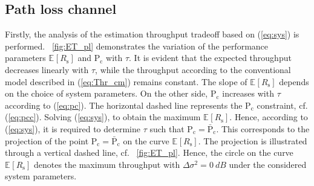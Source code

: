 \documentclass[conference, twocolumn]{IEEEtran}
\newcommand{\e}[2]{{\mathbb E}_{#1}\left[ #2 \right]}
\newcommand{\sub}[1]{_{\text{#1}}}
\newcommand{\pc}{\text{P}\sub{c}}
\newcommand{\pcd}{\bar{\text{P}}\sub{c}}
\newcommand{\rs}{R\sub{s}}
\newcommand{\ers}{\e{}{\rs}}
\newcommand{\npu}{\Delta\sigma^2}
\begin{document}
\subsection{Path loss channel}
Firstly, the analysis of the estimation throughput tradeoff based on (\ref{eq:sys}) is performed. \figurename~\ref{fig:ET_pl} demonstrates the variation of the performance parameters $\ers$ and $\pc$ with $\tau$. It is evident that the expected throughput decreases linearly with $\tau$, while the throughput according to the conventional model described in (\ref{eq:Thr_cm}) remains constant. The slope of $\ers$ depends on the choice of system parameters. On the other side, $\pc$ increases with $\tau$ according to (\ref{eq:pc}). The horizontal dashed line represents the $\pc$ constraint, cf. (\ref{eq:pcc}). Solving (\ref{eq:sys}), to obtain the maximum $\ers$. Hence, according to (\ref{eq:sys}), it is required to determine $\tau$ such that $\pc = \pcd$. This corresponds to the projection of the point $\pc = \pcd$ on the curve $\ers$. The projection is illustrated through a vertical dashed line, cf. \figurename~\ref{fig:ET_pl}. Hence, the circle on the curve $\ers$ denotes the maximum throughput with $\npu = \SI{0}{dB}$ under the considered system parameters. 
\end{document}

